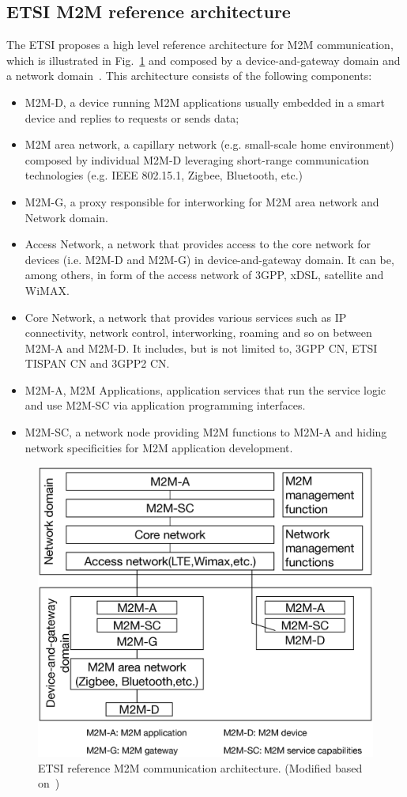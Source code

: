 \subsection{ETSI M2M reference architecture}
The ETSI proposes a high level reference architecture for M2M communication, which is illustrated in Fig.~\ref{fig:etsi-ref-arch} and composed by a device-and-gateway domain and a network domain~\cite{ETSI/TS/102/690}. This architecture consists of the following components: \begin{itemize}[leftmargin=*, noitemsep]
	\item M2M-D, a device running M2M applications usually embedded in a smart device and replies to requests or sends data;
	\item M2M area network, a capillary network (e.g. small-scale home environment) composed by individual M2M-D leveraging short-range communication technologies  (e.g. IEEE 802.15.1, Zigbee, Bluetooth, etc.)
	\item M2M-G, a proxy responsible for interworking for M2M area network and Network domain.
	\item Access Network, a network that provides access to the core network for devices (i.e. M2M-D and M2M-G) in device-and-gateway domain. It can be, among others, in form of the access network of 3GPP, xDSL, satellite and WiMAX.
	\item Core Network, a network that provides various services such as IP connectivity, network control, interworking, roaming and so on between M2M-A and M2M-D. It includes, but is not limited to, 3GPP CN, ETSI TISPAN CN and 3GPP2 CN.
	\item M2M-A, M2M Applications, application services that run the service logic and use M2M-SC via application programming interfaces.
	\item M2M-SC, a network node providing M2M functions to M2M-A and hiding network specificities for M2M application development.
\end{itemize}
\begin{figure}[!t]
	\centering
	\includegraphics[width=0.8\linewidth]{Chapter2/Figures/ETSI-ref-architecture}
	\caption{ETSI reference M2M communication architecture. (Modified based on~\cite{ETSI/TS/102/690})}
	\label{fig:etsi-ref-arch}
\end{figure}

